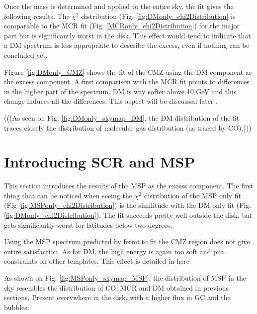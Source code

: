 Once the mass is determined and applied to the entire sky, the fit gives the following results. The $\chi^2$ distribution (Fig. \ref{fig:DMonly_chi2Distribution} is comparable to the MCR fit (Fig. \ref{MCRonly_chi2Distribution}) for the major part but is significantly worst in the disk. This effect would tend to indicate that a DM spectrum is less appropriate to describe the excess, even if nothing can be concluded yet.

Figure \ref{fig:DMonly_CMZ} shows the fit of the CMZ using the DM component as the excess component. A first comparison with the MCR fit points to differences in the higher part of the spectrum. DM is way softer above 10 GeV and this change induces all the differences. This aspect will be discussed later .



(((As seen on Fig. \ref{fig:DMonly_skymap_DM}, the DM distribution of the fit traces closely the distribution of molecular gas distribution (as traced by CO).)))



\section{Introducing SCR and MSP}
%

This section introduces the results of the MSP as the excess component.
The first thing that can be noticed when seeing the $\chi^2$ distribution of the MSP only fit (Fig \ref{fig:MSPonly_chi2Distribution}) is the similitude with the DM only fit (Fig. \ref{fig:DMonly_chi2Distribution}). The fit succeeds pretty well outside the disk, but gets significantly worst for latitudes below two degrees.


Using the MSP spectrum predicted by fermi  to fit the CMZ region does not give entire satisfaction.
As for DM, the high energy is again too soft and put constraints on other templates. This effect is detailed in here 


As shown on Fig. \ref{fig:MSPonly_skymap_MSP}, the distribution of MSP in the sky resembles the distribution of CO, MCR and DM obtained in previous sections. Present everywhere in the disk, with a higher flux in GC and the bubbles.




